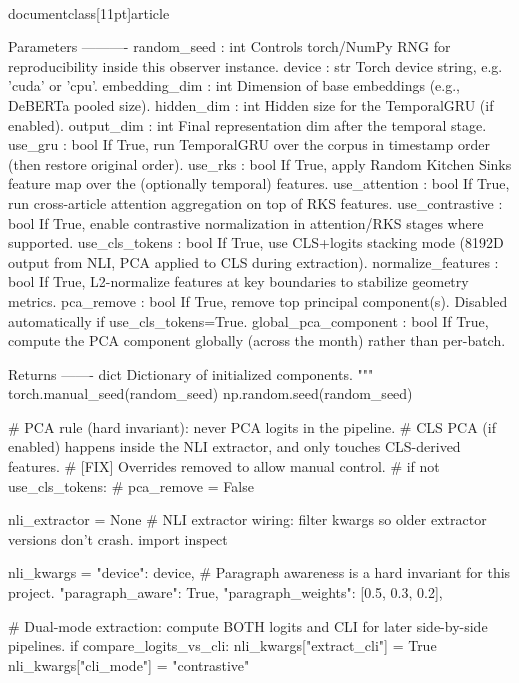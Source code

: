 \\documentclass[11pt]{article}
\begin{document}
\begin{CodeBlock}
    Parameters
    ----------
    random_seed : int
        Controls torch/NumPy RNG for reproducibility inside this observer instance.
    device : str
        Torch device string, e.g. 'cuda' or 'cpu'.
    embedding_dim : int
        Dimension of base embeddings (e.g., DeBERTa pooled size).
    hidden_dim : int
        Hidden size for the TemporalGRU (if enabled).
    output_dim : int
        Final representation dim after the temporal stage.
    use_gru : bool
        If True, run TemporalGRU over the corpus in timestamp order (then restore original order).
    use_rks : bool
        If True, apply Random Kitchen Sinks feature map over the (optionally temporal) features.
    use_attention : bool
        If True, run cross-article attention aggregation on top of RKS features.
    use_contrastive : bool
        If True, enable contrastive normalization in attention/RKS stages where supported.
    use_cls_tokens : bool
        If True, use CLS+logits stacking mode (8192D output from NLI, PCA applied to CLS during extraction).
    normalize_features : bool
        If True, L2-normalize features at key boundaries to stabilize geometry metrics.
    pca_remove : bool
        If True, remove top principal component(s). Disabled automatically if use_cls_tokens=True.
    global_pca_component : bool
        If True, compute the PCA component globally (across the month) rather than per-batch.

    Returns
    -------
    dict
        Dictionary of initialized components.
    """
    torch.manual_seed(random_seed)
    np.random.seed(random_seed)

    # PCA rule (hard invariant): never PCA logits in the pipeline.
    # CLS PCA (if enabled) happens inside the NLI extractor, and only touches CLS-derived features.
    # [FIX] Overrides removed to allow manual control.
    # if not use_cls_tokens:
    #     pca_remove = False

    nli_extractor = None
    # NLI extractor wiring: filter kwargs so older extractor versions don't crash.
    import inspect

    nli_kwargs = {
        "device": device,
        # Paragraph awareness is a hard invariant for this project.
        "paragraph_aware": True,
        "paragraph_weights": [0.5, 0.3, 0.2],
    }

    # Dual-mode extraction: compute BOTH logits and CLI for later side-by-side pipelines.
    if compare_logits_vs_cli:
        nli_kwargs["extract_cli"] = True
        nli_kwargs["cli_mode"] = "contrastive"


\end{CodeBlock}
\end{document}
